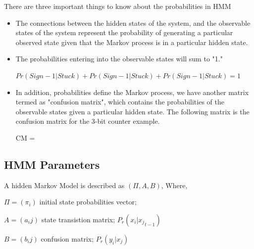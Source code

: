There are three important things to know about the probabilities in HMM

\begin{itemize}
\item The connections between the hidden states of the system, and the observable states of the system represent the probability of generating a particular observed state given that the Markov process is in a particular hidden state.

\item The probabilities entering into the observable states will sum to "1." 

\begin{center}
$Pr(Sign-1|Stuck) + Pr(Sign-1|Stuck) + Pr(Sign-1|Stuck)  = 1 $
\end{center}

\item In addition, probabilities define the Markov process, we have another matrix termed as "confusion matrix", which contains the probabilities of the observable states given a particular hidden state. The following matrix is the confusion matrix for the 3-bit counter example.


\begin{center}


CM = 
\end{center}
\end{itemize}


\subsection{HMM Parameters}

A hidden Markov Model is described as $(\Pi, A, B)$, Where,


\begin{center}

$\Pi = (\pi_i)$ initial state probabilities vector;

$A = (a_ij)$ state transistion matrix;  \hspace{0.3cm} $P_r(x_i | {x_j}_{t-1})$

$B = (b_ij)$ confusion matrix;     \hspace{0.3cm}        $P_r(y_i | x_j)$



\end{center}  


